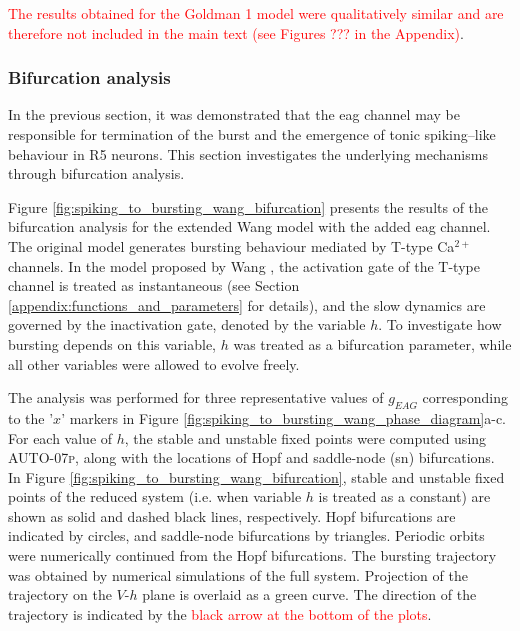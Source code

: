 \documentclass[../main.tex]{subfiles}
\begin{document}
\textcolor{red}{The results obtained for the Goldman 1 model were qualitatively similar and are therefore not included in the main text (see Figures ??? in the Appendix)}. 

\subsubsection{Bifurcation analysis} \label{subsubsec:spiking_to_bursting_bifurcation}

\noindent In the previous section, it was demonstrated that the \gls{eag} channel may be responsible for termination of the burst and the emergence of tonic spiking–like behaviour in R5 neurons. This section investigates the underlying mechanisms through bifurcation analysis.

Figure \ref{fig:spiking_to_bursting_wang_bifurcation} presents the results of the bifurcation analysis for the extended Wang model with the added \gls{eag} channel. The original model generates bursting behaviour mediated by T-type Ca$^{2+}$ channels. In the model proposed by Wang \cite{wangMultipleDynamicalModes1994}, the activation gate of the T-type channel is treated as instantaneous (see Section \ref{appendix:functions_and_parameters} for details), and the slow dynamics are governed by the inactivation gate, denoted by the variable $h$. To investigate how bursting depends on this variable, $h$ was treated as a bifurcation parameter, while all other variables were allowed to evolve freely.

The analysis was performed for three representative values of $g_{EAG}$ corresponding to the '$x$' markers in Figure \ref{fig:spiking_to_bursting_wang_phase_diagram}a-c. For each value of $h$, the stable and unstable fixed points were computed using \textsc{AUTO-07p}, along with the locations of Hopf and saddle-node (\gls{sn}) bifurcations. In Figure \ref{fig:spiking_to_bursting_wang_bifurcation}, stable and unstable fixed points of the reduced system (i.e. when variable $h$ is treated as a constant) are shown as solid and dashed black lines, respectively.
Hopf bifurcations are indicated by circles, and saddle-node bifurcations by triangles. Periodic orbits were numerically continued from the Hopf bifurcations. The bursting trajectory was obtained by numerical simulations of the full system. Projection of the trajectory on the $V$-$h$ plane is overlaid as a green curve. The direction of the trajectory is indicated by the \textcolor{red}{black arrow at the bottom of the plots}.
\end{document}
